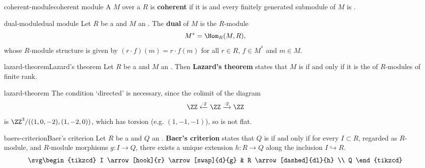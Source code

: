 \begin{topic}{coherent-module}{coherent module}
    A  $M$ over a  $R$ is \textbf{coherent} if it is  and every finitely generated submodule of $M$ is .
\end{topic}

\begin{topic}{dual-module}{dual module}
    Let $R$ be a  and $M$ an . The \textbf{dual} of $M$ is the $R$-module
    \[ M^* = \Hom_R(M, R) , \]
    whose $R$-module structure is given by $(r \cdot f)(m) = r \cdot f(m)$ for all $r \in R$, $f \in M^*$ and $m \in M$.
\end{topic}

\begin{topic}{lazard-theorem}{Lazard's theorem}
    Let $R$ be a  and $M$ an . Then \textbf{Lazard's theorem} states that $M$ is  if and only if it is the  of  $R$-modules of finite rank.
\end{topic}

\begin{example}{lazard-theorem}
    The condition `directed' is necessary, since the colimit of the diagram
    \[ \ZZ \xleftarrow{\cdot 2} \ZZ \xrightarrow{\cdot 2} \ZZ \]
    is $\ZZ^3 / ((1, 0, -2), (1, -2, 0))$, which has torsion (e.g. $(1, -1, -1)$), so is not flat.
\end{example}

\begin{topic}{baers-criterion}{Baer's criterion}
    Let $R$ be a  and $Q$ an . \textbf{Baer's criterion} states that $Q$ is  if and only if for every  $I \subset R$, regarded as $R$-module, and $R$-module morphisms $g : I \to Q$, there exists a unique extension $h : R \to Q$ along the inclusion $I \hookrightarrow R$.
    \[ \svg \begin{tikzcd} I \arrow[hook]{r} \arrow[swap]{d}{g} & R \arrow[dashed]{dl}{h} \\ Q \end{tikzcd} \]
\end{topic}


